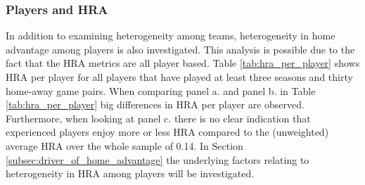 \subsubsection{Players and HRA}
In addition to examining heterogeneity among teams, heterogeneity in home advantage among players is also investigated. This analysis is possible due to the fact that the HRA metrics are all player based. Table \ref{tab:hra_per_player} shows HRA per player for all players that have played at least three seasons and thirty home-away game pairs. When comparing panel a. and panel b. in Table \ref{tab:hra_per_player} big differences in HRA per player are observed. Furthermore, when looking at panel c. there is no clear indication that experienced players enjoy more or less HRA compared to the (unweighted) average HRA over the whole sample of 0.14. In Section \ref{subsec:driver_of_home_advantage} the underlying factors relating to heterogeneity in HRA among players will be investigated.

